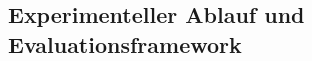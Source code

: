 \documentclass[11pt,a4paper]{article}
\begin{document}
    \subsection{Experimenteller Ablauf und Evaluationsframework}
\end{document}
